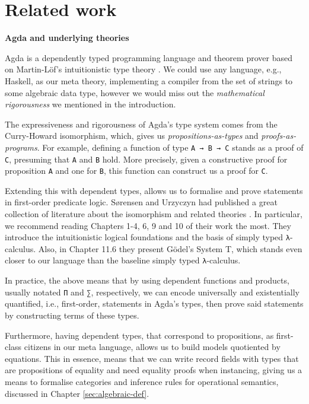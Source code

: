 \chapter{Related work}
\label{ch:relatedwork}

\noindent\textbf{Agda and underlying theories}

Agda \cite{agda} is a dependently typed programming language and theorem prover based on Martin-Löf's intuitionistic type theory \cite{martin1984intuitionistic}. We could use any language, e.g., Haskell, as our meta theory, implementing a compiler from the set of strings to some algebraic data type, however we would miss out the \textit{mathematical rigorousness} we mentioned in the introduction.

The expressiveness and rigorousness of Agda's type system comes from the Curry-Howard isomorphism, which, gives us \textit{propositions-as-types} and \textit{proofs-as-programs}. For example, defining a function of type \verb$A → B → C$ stands as a proof of \verb$C$, presuming that \verb$A$ and \verb$B$ hold. More precisely, given a constructive proof for proposition \verb$A$ and one for \verb$B$, this function can construct us a proof for \verb$C$.

Extending this with dependent types, allows us to formalise and prove statements in first-order predicate logic. S{\o}rensen and Urzyczyn had published a great collection of literature about the isomorphism and related theories \cite{sorensen1998curry}. In particular, we recommend reading Chapters 1-4, 6, 9 and 10 of their work the most. They introduce the intuitionistic logical foundations and the basis of simply typed \verb$λ$-calculus. Also, in Chapter 11.6 they present Gödel's System T, which stands even closer to our language than the baseline simply typed \verb$λ$-calculus.

In practice, the above means that by using dependent functions and products, usually notated \verb$Π$ and \verb$∑$, respectively, we can encode universally and existentially quantified, i.e., first-order, statements in Agda's types, then prove said statements by constructing terms of these types.

Furthermore, having dependent types, that correspond to propositions, as first-class citizens in our meta language, allows us to build models quotiented by equations. This in essence, means that we can write record fields with types that are propositions of equality and need equality proofs when instancing, giving us a means to formalise categories and inference rules for operational semantics, discussed in Chapter \ref{sec:algebraic-def}.

